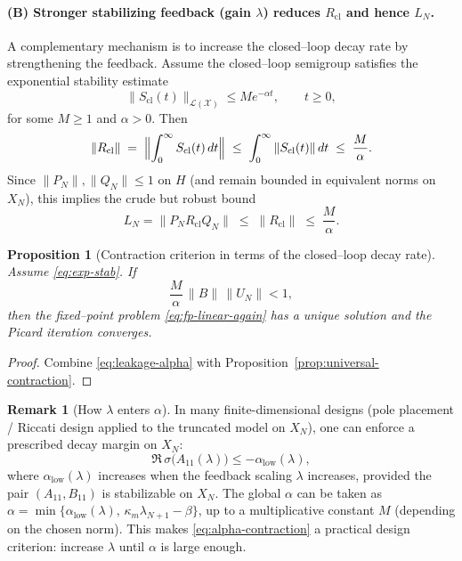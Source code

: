 \documentclass[11pt,a4paper]{article}
\numberwithin{equation}{section}
\newtheorem{proposition}[theorem]{Proposition}
\theoremstyle{definition}
\newtheorem{remark}[theorem]{Remark}
\newcommand{\1}{\mathbbm{1}}
\begin{document}
\paragraph{(B) Stronger stabilizing feedback (gain $\lambda$) reduces $R_{\mathrm{cl}}$ and hence $L_N$.}
A complementary mechanism is to increase the closed--loop decay rate by strengthening the feedback.
Assume the closed--loop semigroup satisfies the exponential stability estimate
\begin{equation}
\label{eq:exp-stab}
\|S_{\mathrm{cl}}(t)\|_{\mathcal{L}(\mathcal{X})} \le M e^{-\alpha t},\qquad t\ge 0,
\end{equation}
for some $M\ge 1$ and $\alpha>0$. Then
\begin{equation}
\label{eq:Rcl-bound}
\|R_{\mathrm{cl}}\|
\;=\;
\Bigl\|\int_0^\infty S_{\mathrm{cl}}(t)\,dt\Bigr\|
\;\le\;
\int_0^\infty \|S_{\mathrm{cl}}(t)\|\,dt
\;\le\;
\frac{M}{\alpha}.
\end{equation}
Since $\|P_N\|,\|Q_N\|\le 1$ on $H$ (and remain bounded in equivalent norms on $X_N$), this implies the crude but robust bound
\begin{equation}
\label{eq:leakage-alpha}
L_N=\|P_NR_{\mathrm{cl}}Q_N\|
\;\le\;
\|R_{\mathrm{cl}}\|
\;\le\;
\frac{M}{\alpha}.
\end{equation}

\begin{proposition}[Contraction criterion in terms of the closed--loop decay rate]
\label{prop:alpha-contraction}
Assume \eqref{eq:exp-stab}. If
\begin{equation}
\label{eq:alpha-contraction}
\frac{M}{\alpha}\,\|B\|\,\|U_N\|<1,
\end{equation}
then the fixed--point problem \eqref{eq:fp-linear-again} has a unique solution and the Picard iteration converges.
\end{proposition}

\begin{proof}
Combine \eqref{eq:leakage-alpha} with Proposition~\ref{prop:universal-contraction}.
\end{proof}

\begin{remark}[How $\lambda$ enters $\alpha$]
In many finite-dimensional designs (pole placement / Riccati design applied to the truncated model on $X_N$),
one can enforce a prescribed decay margin on $X_N$:
\[
\Re\,\sigma\!\bigl(A_{11}(\lambda)\bigr)\le -\alpha_{\mathrm{low}}(\lambda),
\]
where $\alpha_{\mathrm{low}}(\lambda)$ increases when the feedback scaling $\lambda$ increases, provided the pair
$(A_{11},B_{11})$ is stabilizable on $X_N$.
The global $\alpha$ can be taken as $\alpha=\min\{\alpha_{\mathrm{low}}(\lambda),\,\kappa_m\lambda_{N+1}-\beta\}$,
up to a multiplicative constant $M$ (depending on the chosen norm). This makes \eqref{eq:alpha-contraction}
a practical design criterion: increase $\lambda$ until $\alpha$ is large enough.
\end{remark}
\end{document}
